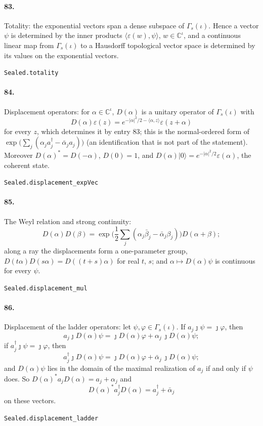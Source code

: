 \documentclass[11pt]{article}
\begin{document}
\paragraph{83.} Totality: the exponential vectors span a dense subspace of $\Gamma_s(\iota)$. Hence a vector $\psi$ is determined by the inner products $\langle \varepsilon(w), \psi\rangle$, $w \in \mathbb C^\iota$, and a continuous linear map from $\Gamma_s(\iota)$ to a Hausdorff topological vector space is determined by its values on the exponential vectors.\par{\footnotesize\texttt{Sealed.totality}}

\paragraph{84.} Displacement operators: for $\alpha \in \mathbb C^\iota$, $D(\alpha)$ is a unitary operator of $\Gamma_s(\iota)$ with \[D(\alpha)\varepsilon(z) = e^{-|\alpha|^2/2 - \langle\alpha, z\rangle} \varepsilon(z + \alpha)\] for every $z$, which determines it by entry 83; this is the normal-ordered form of $\exp\big(\sum_j (\alpha_j a_j^\dagger - \bar\alpha_j a_j)\big)$ (an identification that is not part of the statement). Moreover $D(\alpha)^* = D(-\alpha)$, $D(0) = 1$, and $D(\alpha)|0\rangle = e^{-|\alpha|^2/2} \varepsilon(\alpha)$, the coherent state.\par{\footnotesize\texttt{Sealed.displacement\_expVec}}

\paragraph{85.} The Weyl relation and strong continuity: \[D(\alpha) D(\beta) = \exp\big(\frac12 \sum_j (\alpha_j \bar\beta_j - \bar\alpha_j \beta_j)\big) D(\alpha + \beta);\] along a ray the displacements form a one-parameter group, $D(t\alpha) D(s\alpha) = D((t + s)\alpha)$ for real $t$, $s$; and $\alpha \mapsto D(\alpha)\psi$ is continuous for every $\psi$.\par{\footnotesize\texttt{Sealed.displacement\_mul}}

\paragraph{86.} Displacement of the ladder operators: let $\psi, \varphi \in \Gamma_s(\iota)$. If $a_j\jmath\psi = \jmath\varphi$, then \[a_j \jmath D(\alpha)\psi = \jmath D(\alpha)\varphi + \alpha_j\, \jmath D(\alpha)\psi;\] if $a_j^\dagger\jmath\psi = \jmath\varphi$, then \[a_j^\dagger \jmath D(\alpha)\psi = \jmath D(\alpha)\varphi + \bar\alpha_j\, \jmath D(\alpha)\psi;\] and $D(\alpha)\psi$ lies in the domain of the maximal realization of $a_j$ if and only if $\psi$ does. So $D(\alpha)^* a_j D(\alpha) = a_j + \alpha_j$ and \[D(\alpha)^* a_j^\dagger D(\alpha) = a_j^\dagger + \bar\alpha_j\] on these vectors.\par{\footnotesize\texttt{Sealed.displacement\_ladder}}
\end{document}
